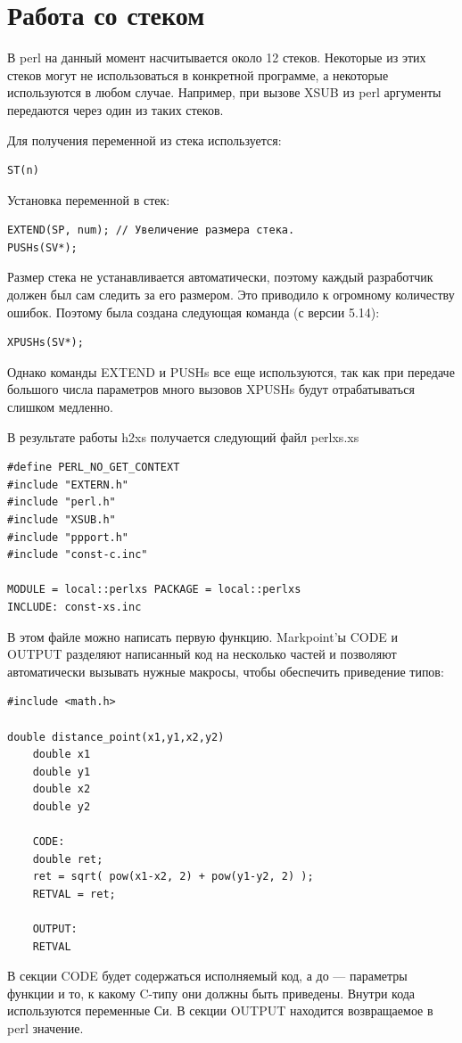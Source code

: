 \section{Работа со стеком} %
В perl на данный момент насчитывается около 12 стеков. Некоторые из этих стеков могут не использоваться в конкретной программе, а некоторые используются в любом случае. Например, при вызове XSUB из perl аргументы передаются через один из таких стеков.

Для получения переменной из стека используется:
\begin{verbatim}
ST(n)
\end{verbatim}
Установка переменной в стек:
\begin{verbatim}
EXTEND(SP, num); // Увеличение размера стека.
PUSHs(SV*);
\end{verbatim}
Размер стека не устанавливается автоматически, поэтому каждый разработчик должен был сам следить за его размером. Это приводило к огромному количеству ошибок. Поэтому была создана следующая команда (с версии 5.14):
\begin{verbatim}
XPUSHs(SV*);
\end{verbatim}
Однако команды EXTEND и PUSHs все еще используются, так как при передаче большого числа параметров много вызовов XPUSHs будут отрабатываться слишком медленно.

В результате работы h2xs получается следующий файл perlxs.xs
\begin{verbatim}
#define PERL_NO_GET_CONTEXT
#include "EXTERN.h"
#include "perl.h"
#include "XSUB.h"
#include "ppport.h"
#include "const-c.inc"

MODULE = local::perlxs PACKAGE = local::perlxs
INCLUDE: const-xs.inc
\end{verbatim}
В этом файле можно написать первую функцию. Markpoint'ы CODE и OUTPUT разделяют написанный код на несколько частей и позволяют автоматически вызывать нужные макросы, чтобы обеспечить приведение типов:
\begin{verbatim}
#include <math.h>

double distance_point(x1,y1,x2,y2)
    double x1
    double y1
    double x2
    double y2

    CODE:
    double ret;
    ret = sqrt( pow(x1-x2, 2) + pow(y1-y2, 2) );
    RETVAL = ret;

    OUTPUT:
    RETVAL
\end{verbatim}
В секции CODE будет содержаться исполняемый код, а до --- параметры функции и то, к какому C-типу они должны быть приведены. Внутри кода используются переменные Си. В секции OUTPUT находится возвращаемое в perl значение.

